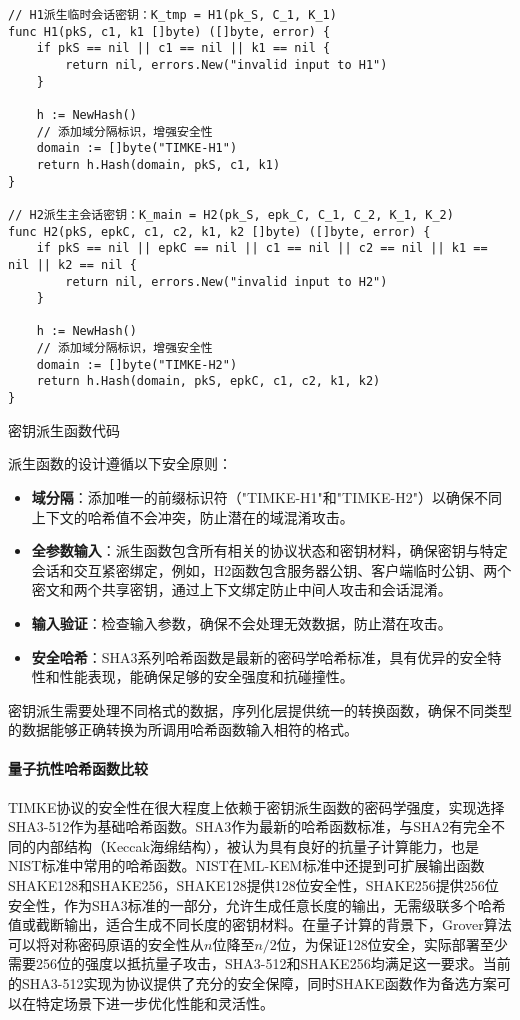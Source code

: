 \begin{listing}[ht]
\begin{verbatim}
// H1派生临时会话密钥：K_tmp = H1(pk_S, C_1, K_1)
func H1(pkS, c1, k1 []byte) ([]byte, error) {
    if pkS == nil || c1 == nil || k1 == nil {
        return nil, errors.New("invalid input to H1")
    }

    h := NewHash()
    // 添加域分隔标识，增强安全性
    domain := []byte("TIMKE-H1")
    return h.Hash(domain, pkS, c1, k1)
}

// H2派生主会话密钥：K_main = H2(pk_S, epk_C, C_1, C_2, K_1, K_2)
func H2(pkS, epkC, c1, c2, k1, k2 []byte) ([]byte, error) {
    if pkS == nil || epkC == nil || c1 == nil || c2 == nil || k1 == nil || k2 == nil {
        return nil, errors.New("invalid input to H2")
    }

    h := NewHash()
    // 添加域分隔标识，增强安全性
    domain := []byte("TIMKE-H2")
    return h.Hash(domain, pkS, epkC, c1, c2, k1, k2)
}
\end{verbatim}
\caption{密钥派生函数代码}
\label{code:key-derivation}
\end{listing}

派生函数的设计遵循以下安全原则：
\begin{itemize}
    \item \textbf{域分隔}：添加唯一的前缀标识符（"TIMKE-H1"和"TIMKE-H2"）以确保不同上下文的哈希值不会冲突，防止潜在的域混淆攻击。
    \item \textbf{全参数输入}：派生函数包含所有相关的协议状态和密钥材料，确保密钥与特定会话和交互紧密绑定，例如，H2函数包含服务器公钥、客户端临时公钥、两个密文和两个共享密钥，通过上下文绑定防止中间人攻击和会话混淆。
    \item \textbf{输入验证}：检查输入参数，确保不会处理无效数据，防止潜在攻击。
    \item \textbf{安全哈希}：SHA3系列哈希函数是最新的密码学哈希标准，具有优异的安全特性和性能表现，能确保足够的安全强度和抗碰撞性。
\end{itemize}

密钥派生需要处理不同格式的数据，序列化层提供统一的转换函数，确保不同类型的数据能够正确转换为所调用哈希函数输入相符的格式。

\paragraph{量子抗性哈希函数比较}
TIMKE协议的安全性在很大程度上依赖于密钥派生函数的密码学强度，实现选择SHA3-512作为基础哈希函数。SHA3作为最新的哈希函数标准，与SHA2有完全不同的内部结构（Keccak海绵结构），被认为具有良好的抗量子计算能力，也是NIST标准中常用的哈希函数。NIST在ML-KEM标准\cite{nist_mlkem_2024}中还提到可扩展输出函数SHAKE128和SHAKE256，SHAKE128提供128位安全性，SHAKE256提供256位安全性，作为SHA3标准的一部分，允许生成任意长度的输出，无需级联多个哈希值或截断输出，适合生成不同长度的密钥材料。在量子计算的背景下，Grover算法可以将对称密码原语的安全性从$n$位降至$n/2$位，为保证128位安全，实际部署至少需要256位的强度以抵抗量子攻击，SHA3-512和SHAKE256均满足这一要求。当前的SHA3-512实现为协议提供了充分的安全保障，同时SHAKE函数作为备选方案可以在特定场景下进一步优化性能和灵活性。

